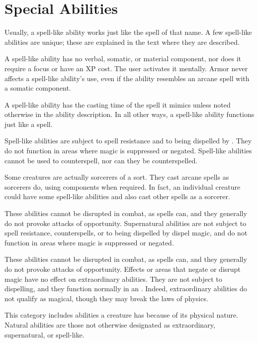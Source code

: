 \section{Special Abilities }

 Usually, a spell-like ability works just like the spell of that name. A few spell-like abilities are unique; these are explained in the text where they are described.

A spell-like ability has no verbal, somatic, or material component, nor does it require a focus or have an XP cost. The user activates it mentally. Armor never affects a spell-like ability's use, even if the ability resembles an arcane spell with a somatic component.

A spell-like ability has the casting time of the spell it mimics unless noted otherwise in the ability description. In all other ways, a spell-like ability functions just like a spell.

Spell-like abilities are subject to spell resistance and to being dispelled by . They do not function in areas where magic is suppressed or negated. Spell-like abilities cannot be used to counterspell, nor can they be counterspelled.

Some creatures are actually sorcerers of a sort. They cast arcane spells as sorcerers do, using components when required. In fact, an individual creature could have some spell-like abilities and also cast other spells as a sorcerer.

 These abilities cannot be disrupted in combat, as spells can, and they generally do not provoke attacks of opportunity. Supernatural abilities are not subject to spell resistance, counterspells, or to being dispelled by dispel magic, and do not function in areas where magic is suppressed or negated.

 These abilities cannot be disrupted in combat, as spells can, and they generally do not provoke attacks of opportunity. Effects or areas that negate or disrupt magic have no effect on extraordinary abilities. They are not subject to dispelling, and they function normally in an . Indeed, extraordinary abilities do not qualify as magical, though they may break the laws of physics.

 This category includes abilities a creature has because of its physical nature. Natural abilities are those not otherwise designated as extraordinary, supernatural, or spell-like.

